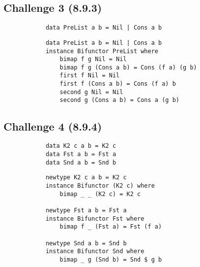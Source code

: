 \documentclass[11pt]{article}
\begin{document}
    \subsection*{Challenge 3 (8.9.3)}
        \begin{verbatim}
            data PreList a b = Nil | Cons a b
        \end{verbatim}
        \begin{verbatim}
            data PreList a b = Nil | Cons a b
            instance Bifunctor PreList where
                bimap f g Nil = Nil
                bimap f g (Cons a b) = Cons (f a) (g b)
                first f Nil = Nil
                first f (Cons a b) = Cons (f a) b
                second g Nil = Nil
                second g (Cons a b) = Cons a (g b)
        \end{verbatim}

    \subsection*{Challenge 4 (8.9.4)}
        \begin{verbatim}
            data K2 c a b = K2 c
            data Fst a b = Fst a 
            data Snd a b = Snd b
        \end{verbatim}
        \begin{verbatim}
            newtype K2 c a b = K2 c
            instance Bifunctor (K2 c) where 
                bimap _ _ (K2 c) = K2 c

            newtype Fst a b = Fst a
            instance Bifunctor Fst where
                bimap f _ (Fst a) = Fst (f a)

            newtype Snd a b = Snd b
            instance Bifunctor Snd where
                bimap _ g (Snd b) = Snd $ g b
        \end{verbatim}
\end{document}
